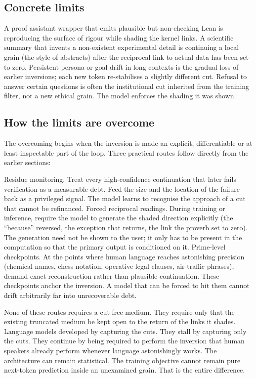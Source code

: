 \documentclass[11pt,a4paper]{article}
\begin{document}
\subsection{Concrete limits}

    A proof assistant wrapper that emits plausible but non-checking Lean is reproducing the surface of rigour while shading the kernel links.
    A scientific summary that invents a non-existent experimental detail is continuing a local grain (the style of abstracts) after the reciprocal link to actual data has been set to zero.
    Persistent persona or goal drift in long contexts is the gradual loss of earlier inversions; each new token re-stabilises a slightly different cut.
    Refusal to answer certain questions is often the institutional cut inherited from the training filter, not a new ethical grain. The model enforces the shading it was shown.

\subsection{How the limits are overcome} The overcoming begins when the inversion is made an explicit, differentiable or at least inspectable part of the loop. Three practical routes follow directly from the earlier sections:

    Residue monitoring. Treat every high-confidence continuation that later fails verification as a measurable debt. Feed the size and the location of the failure back as a privileged signal. The model learns to recognise the approach of a cut that cannot be refinanced.
    Forced reciprocal readings. During training or inference, require the model to generate the shaded direction explicitly (the ``because'' reversed, the exception that returns, the link the proverb set to zero). The generation need not be shown to the user; it only has to be present in the computation so that the primary output is conditioned on it.
    Prime-level checkpoints. At the points where human language reaches astonishing precision (chemical names, chess notation, operative legal clauses, air-traffic phrases), demand exact reconstruction rather than plausible continuation. These checkpoints anchor the inversion. A model that can be forced to hit them cannot drift arbitrarily far into unrecoverable debt.

None of these routes requires a cut-free medium. They require only that the existing truncated medium be kept open to the return of the links it shades. Language models developed by capturing the cuts. They stall by capturing only the cuts. They continue by being required to perform the inversion that human speakers already perform whenever language astonishingly works. The architecture can remain statistical. The training objective cannot remain pure next-token prediction inside an unexamined grain. That is the entire difference.
\end{document}

